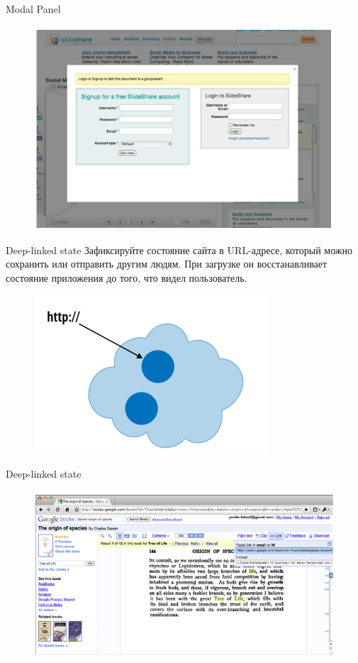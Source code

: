 \documentclass{beamer}
\begin{document}
\begin{frame}[t]{Modal Panel}
	\begin{figure}[h]
		\centering
		\includegraphics[scale=0.5]{images/lec07-pic32.png}
	\end{figure}
\end{frame}

\begin{frame}[t]{Deep-linked state}
	Зафиксируйте состояние сайта в URL-адресе, который можно сохранить или отправить другим людям. При загрузке он восстанавливает состояние приложения до того, что видел пользователь. 
	\begin{figure}[h]
		\centering
		\includegraphics[scale=0.75]{images/lec07-pic33.png}
	\end{figure}
\end{frame}

\begin{frame}[t]{Deep-linked state}
	\begin{figure}[h]
		\centering
		\includegraphics[scale=0.5]{images/lec07-pic34.png}
	\end{figure}
\end{frame}
\end{document}
